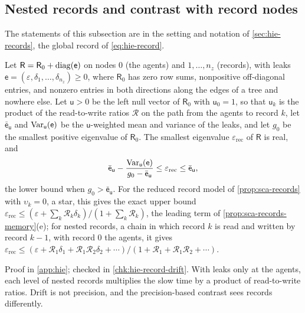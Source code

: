 \subsection{Nested records and contrast with record nodes}\label{sup:hie-nested-records-and-contrast-with-record}

The statements of this subsection are in the setting and notation of \cref{sec:hie-records}, the global record of \eqref{eq:hie-record}.

\begin{proposition}\label{prop:hie-nested-records}
Let $\mathsf R=\mathsf R_0+\operatorname{diag}(\mathsf e)$ on nodes $0$ (the agents) and $1,\dots,n_z$ (records), with leaks $\mathsf e=(\varepsilon,\delta_1,\dots,\delta_{n_z})\ge0$, where $\mathsf R_0$ has zero row sums, nonpositive off-diagonal entries, and nonzero entries in both directions along the edges of a tree and nowhere else. Let $\mathsf u>0$ be the left null vector of $\mathsf R_0$ with $\mathsf u_0=1$, so that $\mathsf u_k$ is the product of the read-to-write ratios $\mathcal R$ on the path from the agents to record $k$, let $\bar{\mathsf e}_{\mathsf u}$ and $\operatorname{Var}_{\mathsf u}(\mathsf e)$ be the $\mathsf u$-weighted mean and variance of the leaks, and let $g_0$ be the smallest positive eigenvalue of $\mathsf R_0$. The smallest eigenvalue $\varepsilon_{\mathrm{rec}}$ of $\mathsf R$ is real, and
\begin{equation}\label{eq:hie-nested}
\bar{\mathsf e}_{\mathsf u}-\frac{\operatorname{Var}_{\mathsf u}(\mathsf e)}{g_0-\bar{\mathsf e}_{\mathsf u}}\le\varepsilon_{\mathrm{rec}}\le\bar{\mathsf e}_{\mathsf u},
\end{equation}
the lower bound when $g_0>\bar{\mathsf e}_{\mathsf u}$. For the reduced record model of \cref{prop:sca-records} with $\upsilon_k=0$, a star, this gives the exact upper bound $\varepsilon_{\mathrm{rec}}\le(\varepsilon+\sum_k\mathcal R_k\delta_k)/(1+\sum_k\mathcal R_k)$, the leading term of \cref{prop:sca-records-memory}(e); for nested records, a chain in which record $k$ is read and written by record $k-1$, with record $0$ the agents, it gives $\varepsilon_{\mathrm{rec}}\le(\varepsilon+\mathcal R_1\delta_1+\mathcal R_1\mathcal R_2\delta_2+\cdots)/(1+\mathcal R_1+\mathcal R_1\mathcal R_2+\cdots)$.
\end{proposition}

Proof in \cref{app:hie}; checked in \cref{chk:hie-record-drift}. With leaks only at the agents, each level of nested records multiplies the slow time by a product of read-to-write ratios. Drift is not precision, and the precision-based contrast sees records differently.

